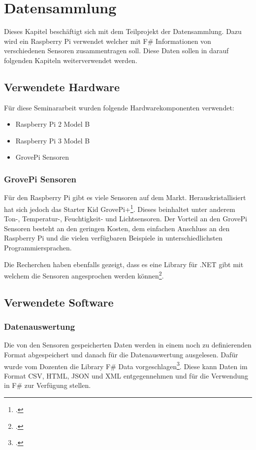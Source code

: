 
\chapter{Datensammlung}
Dieses Kapitel beschäftigt sich mit dem Teilprojekt der Datensammlung. 
Dazu wird ein Raspberry Pi verwendet welcher mit F\# Informationen von verschiedenen Sensoren zusammentragen soll.
Diese Daten sollen in darauf folgenden Kapiteln weiterverwendet werden.

\section{Verwendete Hardware}
Für diese Seminararbeit wurden folgende Hardwarekomponenten verwendet:

\begin{itemize}
\item Raspberry Pi 2 Model B
\item Raspberry Pi 3 Model B
\item GrovePi Sensoren
\end{itemize}


\subsection{GrovePi Sensoren}
Für den Raspberry Pi gibt es viele Sensoren auf dem Markt. Herauskristallisiert hat sich jedoch das Starter Kid GrovePi+\footcite{GrovePi_2016-04-24}. Dieses beinhaltet unter anderem Ton-, Temperatur-, Feuchtigkeit- und Lichtsensoren. Der Vorteil an den GrovePi Sensoren besteht an den geringen Kosten, dem einfachen Anschluss an den Raspberry Pi und die vielen verfügbaren Beispiele in unterschiedlichsten Programmiersprachen.

Die Recherchen haben ebenfalls gezeigt, dass es eine Library für .NET gibt mit welchem die Sensoren angesprochen werden können\footcite{NuGet_GrovePi_2016-04-24}.


\section{Verwendete Software}
\subsection{Datenauswertung}
Die von den Sensoren gespeicherten Daten werden in einem noch zu definierenden Format abgespeichert und danach für die Datenauswertung ausgelesen. Dafür wurde vom Dozenten die Library F\# Data vorgeschlagen\footcite{Fsharp_Data_2016-04-24}. Diese kann Daten im Format CSV, HTML, JSON und XML entgegennehmen und für die Verwendung in F\# zur Verfügung stellen.


